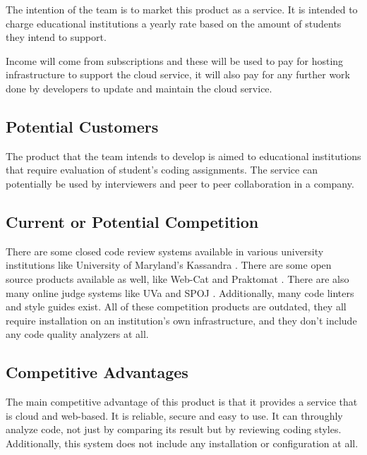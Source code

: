 
The intention of the team is to market this product as a service. It is intended to charge
educational institutions a yearly rate based on the amount of students they
intend to support.

Income will come from subscriptions and these will be used to pay for hosting
infrastructure to support the cloud service, it will also pay for any further
work done by developers to update and maintain the cloud service.

\subsection{Potential Customers}

The product that the team intends to develop is aimed to educational institutions that
require evaluation of student's coding assignments. The service can potentially
be used by interviewers and peer to peer collaboration in a company.

\subsection{Current or Potential Competition}

There are some closed code review systems available in various university
institutions like University of Maryland's Kassandra \cite{Matt1994}. There are
some open source products available as well, like Web-Cat \cite{WebCat} and
Praktomat \cite{Praktomat}. There are also many online judge systems like UVa
\cite{UVA} and SPOJ \cite{SPOJ}. Additionally, many code linters and style
guides exist. All of these competition products are outdated, they all require
installation on an institution's own infrastructure, and they don't include any
code quality analyzers at all.

\subsection{Competitive Advantages}

The main competitive advantage of this product is that it provides a service that is cloud and
web-based. It is reliable, secure and easy to use. It can throughly analyze
code, not just by comparing its result but by reviewing coding styles.
Additionally, this system does not include any installation or configuration at
all.




